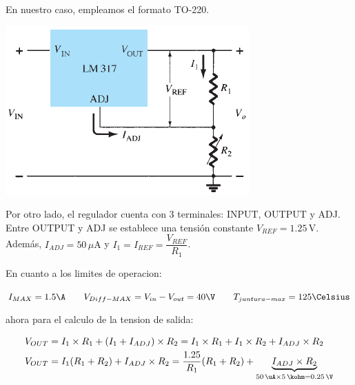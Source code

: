 \documentclass[chaptersright]{informeutn}
\begin{document}
          En nuestro caso, empleamos el formato TO-220.\\
         
          \begin{center}
            \begin{minipage}{0.45\textwidth}
              \centering
              \includegraphics[width=\linewidth]{pictures/Salida_lm317.png}
            \end{minipage}%
          \hfill
            \begin{minipage}{0.5\textwidth}
              Por otro lado, el regulador cuenta con 3 terminales: INPUT, OUTPUT y ADJ. Entre OUTPUT y ADJ se establece
              una tensión constante $V_{REF} = 1.25\,\mathrm{V}$. Además, $I_{ADJ} = 50\,\mu\mathrm{A}$ \quad y \quad
              $I_1 = I_{REF} = \dfrac{V_{REF}}{R_1}$.
            \end{minipage}
          \end{center}

        En cuanto a los limites de operacion:

        \begin{center}
          $I_{MAX}=1.5\A \qquad V_{Diff-MAX}=V_{in}-V_{out}=40\V \qquad T_{juntura-max}=125\Celsius$ 
        \end{center}
        
        ahora para el calculo de la tension de salida:

        \begin{align*}
          V_{OUT} &= I_1 \times R_1 + \left(I_1 + I_{ADJ}\right) \times R_2 
          = I_1 \times R_1 + I_1 \times R_2 + I_{ADJ} \times R_2 \\
          V_{OUT} &= I_1 (R_1 + R_2) + I_{ADJ} \times R_2 
          = \frac{1.25}{R_1} (R_1 + R_2) + \underbrace{I_{ADJ} \times R_2}_{50\,\uA \times 5\,\kohm = 0.25\,\V}
        \end{align*}
        
\end{document}
